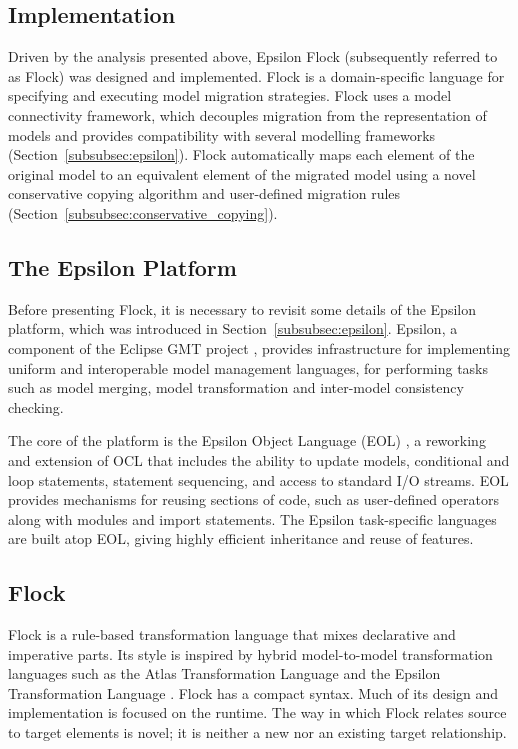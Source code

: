 \subsection{Implementation}
\label{subsec:flock_implementation}
Driven by the analysis presented above, Epsilon Flock (subsequently referred to as Flock) was designed and implemented. Flock is a domain-specific language for specifying and executing model migration strategies. Flock uses a model connectivity framework, which decouples migration from the representation of models and provides compatibility with several modelling frameworks (Section~\ref{subsubsec:epsilon}). Flock automatically maps each element of the original model to an equivalent element of the migrated model using a novel conservative copying algorithm and user-defined migration rules (Section~\ref{subsubsec:conservative_copying}).


\subsection{The Epsilon Platform}
\label{subsec:epsilon}
Before presenting Flock, it is necessary to revisit some details of the Epsilon \cite{kolovos09thesis} platform, which was introduced in Section~\ref{subsubsec:epsilon}. Epsilon, a component of the Eclipse GMT project \cite{gmt}, provides infrastructure for implementing uniform and interoperable model management languages, for performing tasks such as model merging, model transformation and inter-model consistency checking. 

The core of the platform is the Epsilon Object Language (EOL) \cite{kolovos06eol}, a reworking and extension of OCL that includes the ability to update models, conditional and loop statements, statement sequencing, and access to standard I/O streams. EOL provides mechanisms for reusing sections of code, such as user-defined operators along with modules and import statements. The Epsilon task-specific languages are built atop EOL, giving highly efficient inheritance and reuse of features.

\subsection{Flock}
Flock is a rule-based transformation language that mixes declarative and imperative parts. Its style is inspired by hybrid model-to-model transformation languages such as the Atlas Transformation Language \cite{jouault05transforming} and the Epsilon Transformation Language \cite{kolovos08etl}. Flock has a compact syntax. Much of its design and implementation is focused on the runtime. The way in which Flock relates source to target elements is novel; it is neither a new nor an existing target relationship. 

